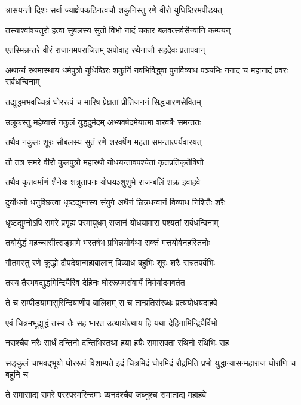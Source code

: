 \twolineshloka
{त्रासयन्तौ दिशः सर्वा ज्याक्षेपकठिनत्वचौ}
{शकुनिस्तु रणे वीरो युधिष्ठिरमपीडयत्}


\twolineshloka
{तस्याश्वांश्चतुरो हत्वा सुबलस्य सुतो विभो}
{नादं चकार बलवत्सर्वसैन्यानि कम्पयन्}


\twolineshloka
{एतस्मिन्नन्तरे वीरं राजानमपराजितम्}
{अपोवाह रथेनाजौ सहदेवः प्रतापवान्}


\threelineshloka
{अथान्यं रथमास्थाय धर्मपुत्रो युधिष्ठिरः}
{शकुनिं नवभिर्विद्ध्वा पुनर्विव्याध पञ्चभिः}
{ननाद च महानादं प्रवरः सर्वधन्विनाम्}


\twolineshloka
{तद्युद्धमभवच्चित्रं घोररूपं च मारिष}
{प्रेक्षतां प्रीतिजननं सिद्धचारणसेवितम्}


\twolineshloka
{उलूकस्तु महेष्वासं नकुलं युद्धदुर्मदम्}
{अभ्यवर्षदमेयात्मा शरवर्षैः समन्ततः}


\twolineshloka
{तथैव नकुलः शूरः सौबलस्य सुतं रणे}
{शरवर्षेण महता समन्तात्पर्यवारयत्}


\twolineshloka
{तौ तत्र समरे वीरौ कुलपुत्रौ महारथौ}
{योधयन्तावपश्येतां कृतप्रतिकृतैषिणौ}


\twolineshloka
{तथैव कृतवर्माणं शैनेयः शत्रुतापनः}
{योधयञ्शुशुभे राजन्बलिं शक्र इवाहवे}


\twolineshloka
{दुर्योधनो धनुश्छित्त्वा धृष्टद्युम्नस्य संयुगे}
{अथैनं छिन्नधन्वानं विव्याध निशितैः शरैः}


\twolineshloka
{धृष्टद्युम्नोऽपि समरे प्रगृह्य परमायुधम्}
{राजानं योधयामास पश्यतां सर्वधन्विनाम्}


\twolineshloka
{तयोर्युद्धं महच्चासीत्सङ्ग्रामे भरतर्षभ}
{प्रभिन्नयोर्यथा सक्तं मत्तयोर्वनहस्तिनोः}


\twolineshloka
{गौतमस्तु रणे क्रुद्धो द्रौपदेयान्महाबालान्}
{विव्याध बहुभिः शूरः शरैः सन्नतपर्वभिः}


\twolineshloka
{तस्य तैरभवद्युद्धमिन्द्रियैरिव देहिनः}
{घोररूपमसंवार्यं निर्मर्यादमवर्तत}


\twolineshloka
{ते च सम्पीडयामासुरिन्द्रियाणीव बालिशम्}
{स च तान्प्रतिसंरब्धः प्रत्ययोधयदाहवे}


\twolineshloka
{एवं चित्रमभूद्युद्धं तस्य तैः सह भारत}
{उत्थायोत्थाय हि यथा देहिनामिन्द्रियैर्विभो}


\twolineshloka
{नराश्चैव नरैः सार्धं दन्तिनो दन्तिभिस्तथा}
{हया हयैः समासक्ता रथिनो रथिभिः सह}


सङ्कुलं चाभवद्भूयो घोररूपं विशाम्पते
\twolineshloka
{इदं चित्रमिदं घोरमिदं रौद्रमिति प्रभो}
{युद्धान्यासन्महाराज घोरांणि च बहूनि च}


\twolineshloka
{ते समासाद्य समरे परस्परमरिन्दमाः}
{व्यनदंश्चैव जघ्नुश्च समाताद्य महाहवे}


